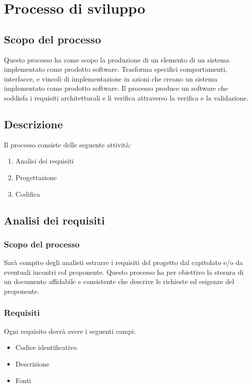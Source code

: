 \documentclass[a4paper,11pt]{article}
\begin{document}
	\newpage
	\section{Processo di sviluppo}
		\subsection{Scopo del processo}
	
		Questo processo ha come scopo la produzione di un elemento di un sistema implementato come prodotto software. Trasforma specifici comportamenti, interfacce, e vincoli di implementazione in azioni che creano un sistema implementato come prodotto software. Il processo produce un software che soddisfa i requisiti architetturali e li verifica attraverso la
	verifica e la validazione.	
		\subsection{Descrizione}
		Il processo consiste delle seguente attività:
			\begin{enumerate}
				\item Analisi dei requisiti
				\item Progettazione
				\item Codifica
			\end{enumerate}
		\subsection{Analisi dei requisiti}
		
			\subsubsection{Scopo del processo}
			Sarà compito degli analisti estrarre i requisiti del progetto dal capitolato e/o da eventuali incontri col proponente. 
			Questo processo ha per obiettivo la stesura di un documento affidabile e consistente che descrive le richieste ed esigenze del proponente.
				
			\subsubsection{Requisiti}
			Ogni requisito dovrà avere i seguenti campi:
			\begin{itemize}
			\item Codice identificativo
			\item Descrizione
			\item Fonti
			\end{itemize}
\end{document}
